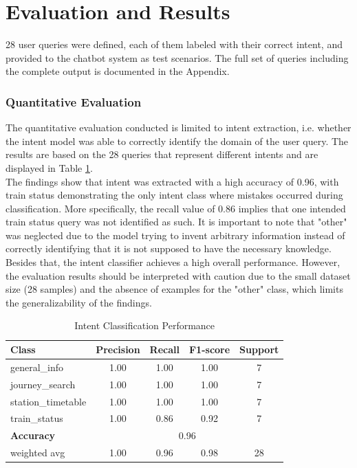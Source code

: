 \documentclass[fleqn,moreauthors,10pt]{ds_report}
\begin{document}
\section*{Evaluation and Results}
28 user queries were defined, each of them labeled with their correct intent, and provided to the chatbot system as test scenarios. The full set of queries including the complete output is documented in the Appendix.

\subsubsection*{Quantitative Evaluation}
The quantitative evaluation conducted is limited to intent extraction, i.e. whether the intent model was able to correctly identify the domain of the user query. The results are based on the 28 queries that represent different intents and are displayed in Table \ref{tab:quantitative}. \\
The findings show that intent was extracted with a high accuracy of 0.96, with train status demonstrating the only intent class where mistakes occurred during classification. More specifically, the recall value of 0.86 implies that one intended train status query was not identified as such. It is important to note that "other" was neglected due to the model trying to invent arbitrary information instead of correctly identifying that it is not supposed to have the necessary knowledge. Besides that, the intent classifier achieves a high overall performance. However, the evaluation results should be interpreted with caution due to the small dataset size (28 samples) and the absence of examples for the "other" class, which limits the generalizability of the findings. 

\begin{table}[h] 
\centering
\small
\caption{Intent Classification Performance}
\label{tab:quantitative}
\begin{tabular}{lcccc}
\toprule
\textbf{Class} & \textbf{Precision} & \textbf{Recall} & \textbf{F1-score} & \textbf{Support} \\
\midrule
general\_info       & 1.00 & 1.00 & 1.00 & 7 \\
journey\_search     & 1.00 & 1.00 & 1.00 & 7 \\
station\_timetable  & 1.00 & 1.00 & 1.00 & 7 \\
train\_status       & 1.00 & 0.86 & 0.92 & 7 \\
\midrule
\textbf{Accuracy}   & \multicolumn{4}{c}{0.96} \\
\midrule
weighted avg        & 1.00 & 0.96 & 0.98 & 28 \\
\bottomrule
\end{tabular}
\end{table}
\end{document}
